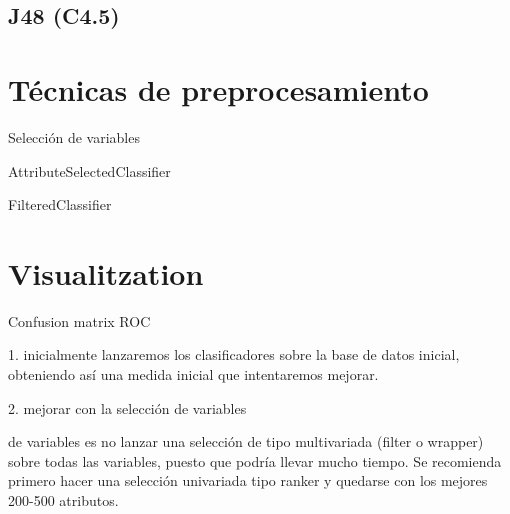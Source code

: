 \documentclass{article}
\begin{document}
\subsection*{J48 (C4.5)}

\section*{Técnicas de preprocesamiento}

Selección de variables

AttributeSelectedClassifier

FilteredClassifier

\section*{Visualitzation}

Confusion matrix
ROC




1. inicialmente lanzaremos los clasificadores sobre la base de datos inicial, obteniendo así una medida inicial que intentaremos mejorar.

2. mejorar con la selección de variables

de variables es no lanzar una selección de tipo multivariada (filter o wrapper) sobre todas las variables, puesto que podría llevar mucho tiempo. Se recomienda primero hacer una selección univariada tipo ranker y quedarse con los mejores 200-500 atributos.
\end{document}
